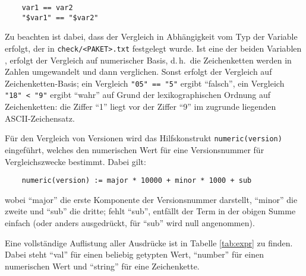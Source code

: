 \begin{example}
\begin{verbatim}
    var1 == var2
    "$var1" == "$var2"
\end{verbatim}
\end{example}

    Zu beachten ist dabei, dass der Vergleich in Abhängigkeit vom Typ
    der Variable erfolgt, der in \texttt{check/<PAKET>.txt} festgelegt
    wurde. Ist eine der beiden Variablen ,
    erfolgt der Vergleich auf numerischer Basis,
    d.\,h.\ die Zeichenketten werden in Zahlen umgewandelt und dann
    verglichen. Sonst erfolgt der Vergleich auf Zeichenketten-Basis; ein
    Vergleich \texttt{"05"\ == "5"} ergibt "`falsch"', ein Vergleich
    \texttt{"18"\ < "9"} ergibt "`wahr"' auf Grund der lexikographischen Ordnung
    auf Zeichenketten: die Ziffer "`1"' liegt vor der Ziffer "`9"' im zugrunde
    liegenden ASCII-Zeichensatz.

    Für den Vergleich von Versionen wird das Hilfskonstrukt
    \texttt{numeric(version)} eingeführt, welches den numerischen Wert für
    eine Versionsnummer für Vergleichszwecke bestimmt. Dabei gilt:

\begin{example}
\begin{verbatim}
    numeric(version) := major * 10000 + minor * 1000 + sub
\end{verbatim}
\end{example}

    wobei "`major"' die erste Komponente der Versionsnummer darstellt,
    "`minor"' die zweite und "`sub"' die dritte; fehlt "`sub"', entfällt der
    Term in der obigen Summe einfach (oder anders ausgedrückt, für "`sub"' wird
    null angenommen).

    Eine vollständige Auflistung aller Ausdrücke ist in Tabelle
    \ref{tab:expr} zu finden. Dabei steht "`val"' für einen beliebig getypten
    Wert, "`number"' für einen numerischen Wert und "`string"' für eine
    Zeichenkette.


